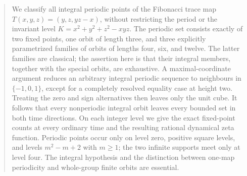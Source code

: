 \begin{abstract}
We classify all integral periodic points of the Fibonacci trace map
$T(x,y,z)=(y,z,yz-x)$, without restricting the period or the invariant
level $K=x^2+y^2+z^2-xyz$. The periodic set consists exactly of two fixed
points, one orbit of length three, and three explicitly parametrized
families of orbits of lengths four, six, and twelve. The latter families
are classical; the assertion here is that their integral members, together
with the special orbits, are exhaustive. A maximal-coordinate argument
reduces an arbitrary integral periodic sequence to neighbours in
$\{-1,0,1\}$, except for a completely resolved equality case at height
two. Treating the zero and sign alternatives then leaves only the unit
cube. It follows that every nonperiodic integral orbit leaves every bounded
set in both time directions. On each integer level we give the exact
fixed-point counts at every ordinary time and the resulting rational
dynamical zeta function. Periodic points occur only on level zero, positive
square levels, and levels $m^2-m+2$ with $m\geq1$; the two infinite
supports meet only at level four. The integral hypothesis and the
distinction between one-map periodicity and whole-group finite orbits
are essential.
\end{abstract}
